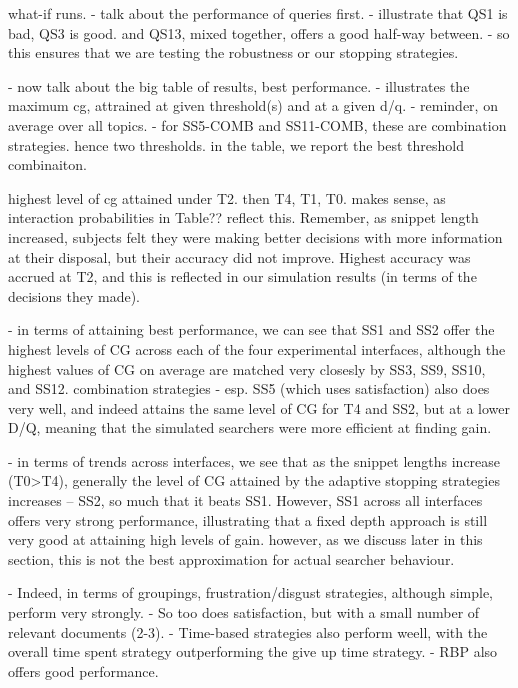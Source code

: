 what-if runs.
    - talk about the performance of queries first.
    - illustrate that QS1 is bad, QS3 is good. and QS13, mixed together, offers a good half-way between.
    - so this ensures that we are testing the robustness or our stopping strategies.
    
    - now talk about the big table of results, best performance.
    - illustrates the maximum cg, attrained at given threshold(s) and at a given d/q.
    - reminder, on average over all topics.
    - for SS5-COMB and SS11-COMB, these are combination strategies. hence two thresholds. in the table, we report the best threshold combinaiton.
    
    highest level of cg attained under T2. then T4, T1, T0. makes sense, as interaction probabilities in Table?? reflect this. Remember, as snippet length increased, subjects felt they were making better decisions with more information at their disposal, but their accuracy did not improve. Highest accuracy was accrued at T2, and this is reflected in our simulation results (in terms of the decisions they made).
    
    - in terms of attaining best performance, we can see that SS1 and SS2 offer the highest levels of CG across each of the four experimental interfaces, although the highest values of CG on average are matched very closesly by SS3, SS9, SS10, and SS12. combination strategies - esp. SS5 (which uses satisfaction) also does very well, and indeed attains the same level of CG for T4 and SS2, but at a lower D/Q, meaning that the simulated searchers were more efficient at finding gain.
    
    - in terms of trends across interfaces, we see that as the snippet lengths increase (T0>T4), generally the level of CG attained by the adaptive stopping strategies increases -- SS2, so much that it beats SS1. However, SS1 across all interfaces offers very strong performance, illustrating that a fixed depth approach is still very good at attaining high levels of gain. however, as we discuss later in this section, this is not the best approximation for actual searcher behaviour.
    
    - Indeed, in terms of groupings, frustration/disgust strategies, although simple, perform very strongly.
    - So too does satisfaction, but with a small number of relevant documents (2-3).
    - Time-based strategies also perform weell, with the overall time spent strategy outperforming the give up time strategy.
    - RBP also offers good performance.
    
